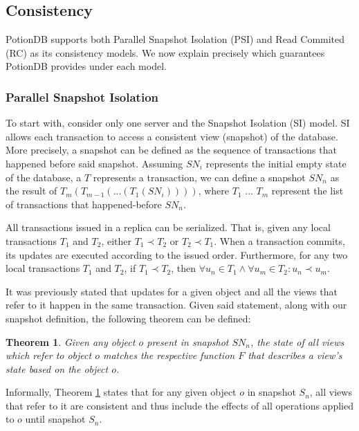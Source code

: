 \documentclass{vldb}
\newtheorem{theorem}{Theorem}
\begin{document}
\subsection{Consistency}

PotionDB supports both Parallel Snapshot Isolation (PSI) \cite{sovran2011transactional} and Read Commited (RC) as its consistency models.
We now explain precisely which guarantees PotionDB provides under each model.

\subsubsection{Parallel Snapshot Isolation}

To start with, consider only one server and the Snapshot Isolation (SI) model. 
SI allows each transaction to access a consistent view (snapshot) of the database.
More precisely, a snapshot can be defined as the sequence of transactions that happened before said snapshot.
Assuming $SN_i$ represents the initial empty state of the database, a $T$ represents a transaction, we can define a snapshot $SN_n$ as the result of $T_m(T_{m-1}(...(T_1(SN_i))))$, where $T_1$ ... $T_m$ represent the list of transactions that happened-before $SN_n$.

All transactions issued in a replica can be serialized.
That is, given any local transactions $T_1$ and $T_2$, either $T_1 \prec T_2$ or $T_2 \prec T_1$.
When a transaction commits, its updates are executed according to the issued order.
Furthermore, for any two local transactions $T_1$ and $T_2$, if  $T_1 \prec T_2$, then $\forall u_n \in T_1 \land \forall u_m \in T_2 : u_n \prec u_m$.

It was previously stated that updates for a given object and all the views that refer to it happen in the same transaction.
Given said statement, along with our snapshot definition, the following theorem can be defined:

\begin{theorem}
\label{theorem:viewobj}
	Given any object $o$ present in snapshot $SN_n$, the state of all views which refer to object $o$ matches the respective function $F$ that describes a view's state based on the object $o$.
\end{theorem}

Informally, Theorem \ref{theorem:viewobj} states that for any given object $o$ in snapshot $S_n$, all views that refer to it are consistent and thus include the effects of all operations applied to $o$ until snapshot $S_n$.
\end{document}
